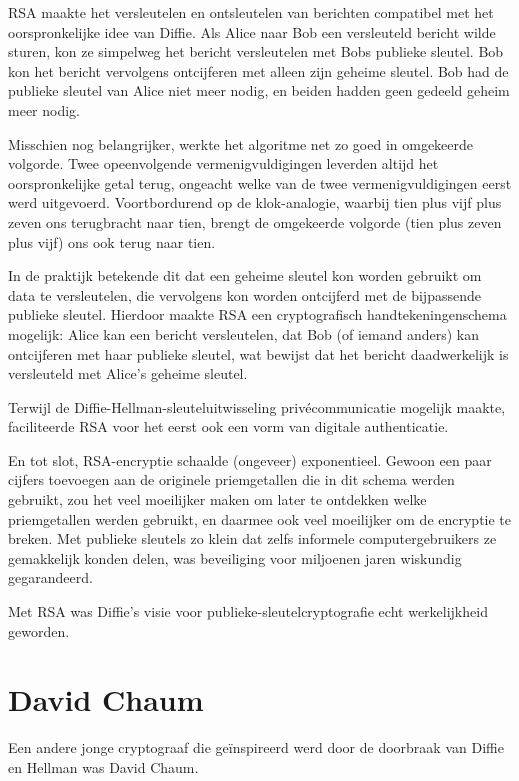 \documentclass[
  a5paper,
  smalldemyvopaper,11pt,twoside,onecolumn,openright,extrafontsizes,
hidelinks]{memoir}
\begin{document}
RSA maakte het versleutelen en ontsleutelen van berichten compatibel met
het oorspronkelijke idee van Diffie. Als Alice naar Bob een versleuteld
bericht wilde sturen, kon ze simpelweg het bericht versleutelen met Bobs
publieke sleutel. Bob kon het bericht vervolgens ontcijferen met alleen
zijn geheime sleutel. Bob had de publieke sleutel van Alice niet meer
nodig, en beiden hadden geen gedeeld geheim meer nodig.

Misschien nog belangrijker, werkte het algoritme net zo goed in
omgekeerde volgorde. Twee opeenvolgende vermenigvuldigingen leverden
altijd het oorspronkelijke getal terug, ongeacht welke van de twee
vermenigvuldigingen eerst werd uitgevoerd. Voortbordurend op de
klok-analogie, waarbij tien plus vijf plus zeven ons terugbracht naar
tien, brengt de omgekeerde volgorde (tien plus zeven plus vijf) ons ook
terug naar tien.

In de praktijk betekende dit dat een geheime sleutel kon worden gebruikt
om data te versleutelen, die vervolgens kon worden ontcijferd met de
bijpassende publieke sleutel. Hierdoor maakte RSA een cryptografisch
handtekeningenschema mogelijk: Alice kan een bericht versleutelen, dat
Bob (of iemand anders) kan ontcijferen met haar publieke sleutel, wat
bewijst dat het bericht daadwerkelijk is versleuteld met Alice's geheime
sleutel.

Terwijl de Diffie-Hellman-sleuteluitwisseling privécommunicatie mogelijk
maakte, faciliteerde RSA voor het eerst ook een vorm van digitale
authenticatie.

En tot slot, RSA-encryptie schaalde (ongeveer) exponentieel. Gewoon een
paar cijfers toevoegen aan de originele priemgetallen die in dit schema
werden gebruikt, zou het veel moeilijker maken om later te ontdekken
welke priemgetallen werden gebruikt, en daarmee ook veel moeilijker om
de encryptie te breken. Met publieke sleutels zo klein dat zelfs
informele computergebruikers ze gemakkelijk konden delen, was
beveiliging voor miljoenen jaren wiskundig gegarandeerd.

Met RSA was Diffie's visie voor publieke-sleutelcryptografie echt
werkelijkheid geworden.

\section{David Chaum}\label{david-chaum}

Een andere jonge cryptograaf die geïnspireerd werd door de doorbraak van
Diffie en Hellman was David Chaum.
\end{document}
